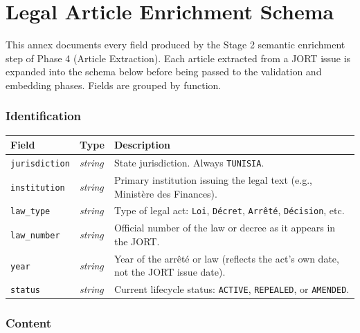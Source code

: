 \chapter{Legal Article Enrichment Schema}
\label{annex:schema}

This annex documents every field produced by the Stage 2 semantic enrichment step of Phase 4 (Article Extraction). Each article extracted from a JORT issue is expanded into the schema below before being passed to the validation and embedding phases. Fields are grouped by function.

\renewcommand{\arraystretch}{1.25}
\newcommand{\schemarow}[3]{\texttt{#1} & \textit{#2} & #3 \\}

\subsection*{Identification}

\begin{tabular}{|p{4cm}|p{2.2cm}|p{7.3cm}|}
\hline
\textbf{Field} & \textbf{Type} & \textbf{Description} \\
\hline
\schemarow{jurisdiction}{string}{State jurisdiction. Always \texttt{TUNISIA}.}
\schemarow{institution}{string}{Primary institution issuing the legal text (e.g., Ministère des Finances).}
\schemarow{law\_type}{string}{Type of legal act: \texttt{Loi}, \texttt{Décret}, \texttt{Arrêté}, \texttt{Décision}, etc.}
\schemarow{law\_number}{string}{Official number of the law or decree as it appears in the JORT.}
\schemarow{year}{string}{Year of the arrêté or law (reflects the act's own date, not the JORT issue date).}
\schemarow{status}{string}{Current lifecycle status: \texttt{ACTIVE}, \texttt{REPEALED}, or \texttt{AMENDED}.}
\hline
\end{tabular}

\subsection*{Content}

